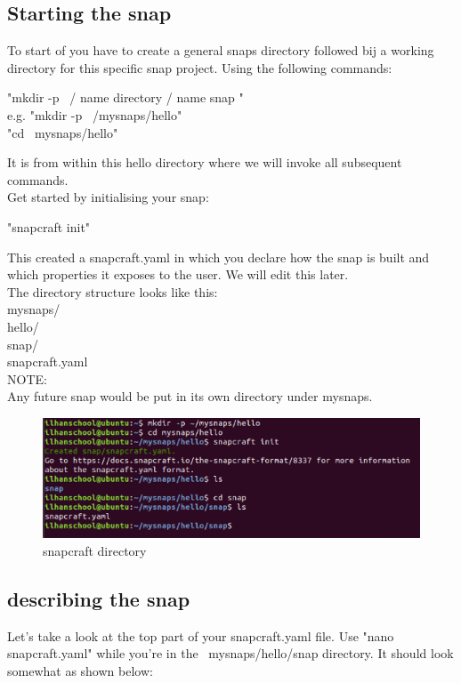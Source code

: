 \documentclass{article}
\begin{document}
\begin{flushleft}
\section{Starting the snap}\label{sec:snap}
To start of you have to create a general snaps directory followed bij a working directory for this specific snap project. Using the following commands:
	\begin{center}	
	"mkdir -p ~/ name directory / name snap "\\
	e.g. "mkdir -p ~/mysnaps/hello"\\
	"cd ~mysnaps/hello"\\
	\end{center}
It is from within this hello directory where we will invoke all subsequent commands.\\
Get started by initialising your snap:\\
	\begin{center}	
	"snapcraft init"\\ 
	\end{center}
This created a snapcraft.yaml in which you declare how the snap is built and which properties it
exposes to the user. We will edit this later.\\
The directory structure looks like this:\\
mysnaps/\\
  hello/\\
    snap/\\
      snapcraft.yaml\\
    	 NOTE:\\
	Any future snap would be put in its own directory under mysnaps.\\
\label{fig:step2}
	\begin{figure}[H]
	\includegraphics[width=5in]{step2.png}
	\caption[Optional caption]{snapcraft directory}
	\end{figure}
	
	\cleardoublepage
%
%
%
%
%
%
\subsection{describing the snap}\label{describe snap}
	Let's take a look at the top part of your snapcraft.yaml file. Use "nano snapcraft.yaml" while you're in the ~mysnaps/hello/snap directory. It should look 
	somewhat as shown below:\\


\end{flushleft}
\end{document}

